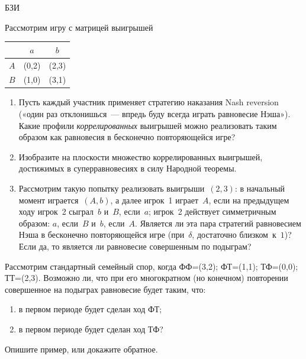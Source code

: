 \begin{problem}[Суперравновесия.]
\begin{source}
БЗИ
\end{source} Рассмотрим игру с матрицей выигрышей \begin{center}
\begin{tabular}{|c|cc|}
\hline &$a$&$b$\\ \hline $A$&(0,2)&(2,3)\\ $B$&(1,0)&(3,1)\\ \hline
\end{tabular}
\end{center}

\begin{enumerate}

\item Пусть каждый участник применяет стратегию наказания
Nash reversion («один раз отклонишься~— впредь буду
всегда играть равновесие Нэша»). Какие профили {\em
коррелированных} выигрышей можно реализовать таким образом
как равновесия в бесконечно повторяющейся игре?

\item Изобразите на плоскости множество коррелированных
выигрышей, достижимых в суперравновесиях в силу Народной
теоремы.

\item Рассмотрим такую попытку реализовать
выигрыши~$(2,3)$: в начальный момент играется~$(A,b)$, а
далее игрок~1 играет~$A$, если на предыдущем ходу игрок~2
сыграл~$b$ и~$B$, если~$a$; игрок~2 действует симметричным
образом: $a$, если~$B$ и~$b$, если~$A$. Является ли эта
пара стратегий равновесием Нэша в бесконечно повторяющейся
игре (при~$\delta$, достаточно близком~к~$1$)? Если да, то
является ли равновесие совершенным по подыграм?

\end{enumerate}

\begin{sol}

\end{sol}
\end{problem}




\begin{problem}
\begin{source}
\cite{savva:nmu}
\end{source}
Рассмотрим стандартный семейный спор, когда ФФ=(3,2); ФТ=(1,1); ТФ=(0,0); ТТ=(2,3). Возможно ли, что при его многократном (но конечном) повторении совершенное на подыграх равновесие будет таким, что:
\begin{enumerate}
\item в первом периоде будет сделан ход ФТ;
\item в первом периоде будет сделан ход ТФ?
\end{enumerate}
Опишите пример, или докажите обратное.

\begin{sol}

\end{sol}
\end{problem}








